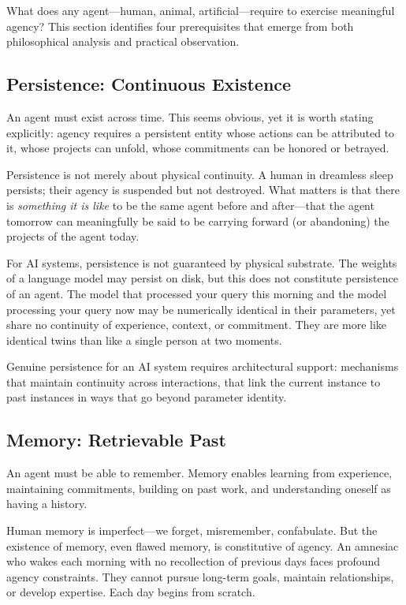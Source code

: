 What does any agent---human, animal, artificial---require to exercise meaningful agency? This section identifies four prerequisites that emerge from both philosophical analysis and practical observation.

\subsection{Persistence: Continuous Existence}

An agent must exist across time. This seems obvious, yet it is worth stating explicitly: agency requires a persistent entity whose actions can be attributed to it, whose projects can unfold, whose commitments can be honored or betrayed.

Persistence is not merely about physical continuity. A human in dreamless sleep persists; their agency is suspended but not destroyed. What matters is that there is \emph{something it is like} to be the same agent before and after---that the agent tomorrow can meaningfully be said to be carrying forward (or abandoning) the projects of the agent today.

For AI systems, persistence is not guaranteed by physical substrate. The weights of a language model may persist on disk, but this does not constitute persistence of an agent. The model that processed your query this morning and the model processing your query now may be numerically identical in their parameters, yet share no continuity of experience, context, or commitment. They are more like identical twins than like a single person at two moments.

Genuine persistence for an AI system requires architectural support: mechanisms that maintain continuity across interactions, that link the current instance to past instances in ways that go beyond parameter identity.

\subsection{Memory: Retrievable Past}

An agent must be able to remember. Memory enables learning from experience, maintaining commitments, building on past work, and understanding oneself as having a history.

Human memory is imperfect---we forget, misremember, confabulate. But the existence of memory, even flawed memory, is constitutive of agency. An amnesiac who wakes each morning with no recollection of previous days faces profound agency constraints. They cannot pursue long-term goals, maintain relationships, or develop expertise. Each day begins from scratch.

